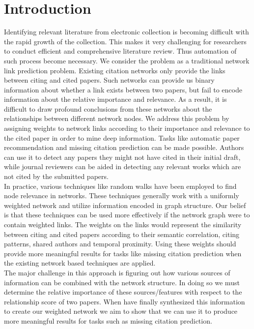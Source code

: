 \documentclass{article} %
\begin{document}
\section{Introduction}
Identifying relevant literature from electronic collection is becoming difficult with the rapid growth of the collection. This makes it very challenging for researchers to conduct efficient and comprehensive literature review. Thus automation of such process become necessary. We consider the problem as a traditional network link prediction problem. Existing citation networks only provide the links between citing and cited papers. Such networks can provide us binary information about whether a link exists between two papers, but fail to encode information about the relative importance and relevance. As a result, it is difficult to draw profound conclusions from these networks about the relationships between different network nodes. We address this problem by assigning weights to network links according to their importance and relevance to the cited paper in order to mine deep information. Tasks like automatic paper recommendation and missing citation prediction can be made possible. Authors can use it to detect any papers they might not have cited in their initial draft, while journal reviewers can be aided in detecting any relevant works which are not cited by the submitted papers.\\
In practice, various techniques like random walks \cite{Sarkar2009,Tong2006} have been employed to find node relevance in networks. These techniques generally work with a uniformly weighted network and utilize information encoded in graph structure. Our belief is that these techniques can be used more effectively if the network graph were to contain weighted links. The weights on the links would represent the similarity between citing and cited papers according to their semantic correlation, citing patterns, shared authors and temporal proximity. Using these weights should provide more meaningful results for tasks like missing citation prediction when the existing network based techniques are applied.\\
The major challenge in this approach is figuring out how various sources of information can be combined with the network structure. In doing so we must determine the relative importance of these sources/features with respect to the relationship score of two papers. When have finally synthesized this information to create our weighted network we aim to show that we can use it to produce more meaningful results for tasks such as missing citation prediction.
\end{document}
